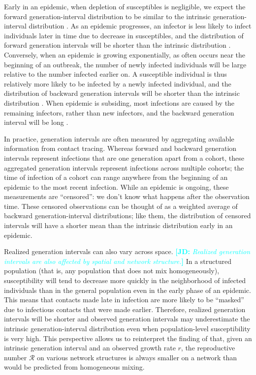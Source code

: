 \documentclass[12pt]{article}
\newcommand{\RR}{\ensuremath{{\mathcal R}}}
\newcommand{\comment}[3]{\textcolor{#1}{\textbf{[#2: }\textsl{#3}\textbf{]}}}
\newcommand{\jd}[1]{\comment{cyan}{JD}{#1}}
\begin{document}
Early in an epidemic, when depletion of susceptibles is negligible, we expect the forward generation-interval distribution to be similar to the intrinsic generation-interval distribution \citep{champredon2015intrinsic}.
As an epidemic progresses, an infector is less likely to infect individuals later in time due to decrease in susceptibles, 
and the distribution of forward generation intervals will be shorter than the intrinsic distribution \citep{kenah2008generation, tomba2010some, champredon2015intrinsic}.
Conversely, when an epidemic is growing exponentially, as often occurs near the beginning of an outbreak, the number of newly infected individuals will be large relative to the number infected earlier on. 
A susceptible individual is thus relatively more likely to be infected by a newly infected individual, 
and the distribution of backward generation intervals will be shorter than the intrinsic distribution \citep{champredon2015intrinsic, britton2019estimation}.
When epidemic is subsiding, most infections are caused by the remaining infectors, rather than new infectors, and the backward generation interval will be long \citep{tomba2010some, champredon2015intrinsic}.

In practice, generation intervals are often measured by aggregating available information from contact tracing. 
Whereas forward and backward generation intervals represent infections that are one generation apart from a cohort, these aggregated generation intervals represent infections across multiple cohorts; 
the time of infection of a cohort can range anywhere from the beginning of an epidemic to the most recent infection.
While an epidemic is ongoing, these measurements are ``censored'': we don't know what happens after the observation time.
These censored observations can be thought of as a weighted average of backward generation-interval distributions; like them, the distribution of censored intervals will have a shorter mean than the intrinsic distribution early in an epidemic.

Realized generation intervals can also vary across space.
\jd{Realized generation intervals are also affected by spatial and network structure.}
In a structured population (that is, any population that does not mix homogeneously), susceptibility will tend to decrease more quickly in the neighborhood of infected individuals than in the general population even in the early phase of an epidemic. 
This means that contacts made late in infection are more likely to be ``masked'' due to infectious contacts that were made earlier.
Therefore, realized generation intervals will be shorter and observed generation intervals may underestimate the intrinsic generation-interval distribution even when population-level susceptibility is very high.
This perspective allows us to reinterpret the finding of \cite{trapman2016inferring} that, given an intrinsic generation interval and an observed growth rate $r$, the reproductive number $\RR$ on various network structures is always smaller on a network than would be predicted from homogeneous mixing.
\end{document}
